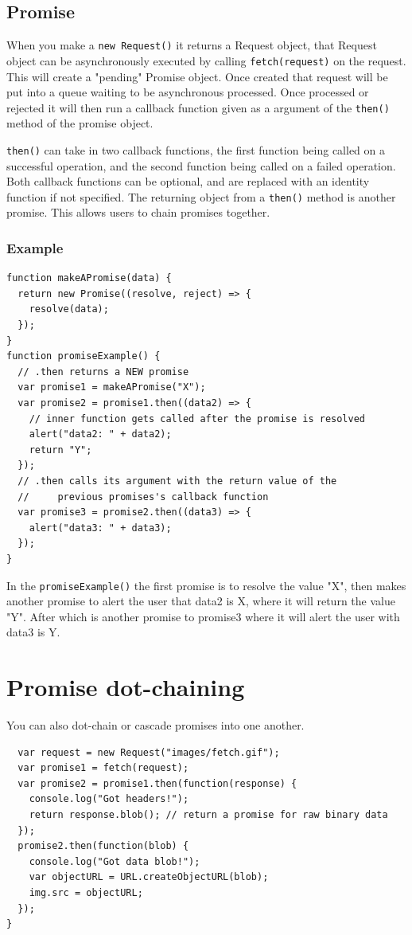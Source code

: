 \documentclass[../CMPUT-404-Notes.tex]{subfiles}
\begin{document}
\subsection{Promise}
When you make a \texttt{new Request()} it returns a Request object, that Request object can be asynchronously executed by calling \texttt{fetch(request)} on the request. This will create a "pending" Promise object. Once created that request will be put into a queue waiting to be asynchronous processed. Once processed or rejected it will then run a callback function given as a argument of the \texttt{then()} method of the promise object. 

\texttt{then()} can take in two callback functions, the first function being called on a successful operation, and the second function being called on a failed operation. 
Both callback functions can be optional, and are replaced with an identity function if not specified. 
The returning object from a \texttt{then()} method is another promise. This allows users to chain promises together. 


\subsubsection{Example}
\begin{verbatim}
function makeAPromise(data) {
  return new Promise((resolve, reject) => {
    resolve(data);
  });
}
function promiseExample() {
  // .then returns a NEW promise
  var promise1 = makeAPromise("X");
  var promise2 = promise1.then((data2) => {
    // inner function gets called after the promise is resolved
    alert("data2: " + data2);
    return "Y";
  });
  // .then calls its argument with the return value of the
  //     previous promises's callback function
  var promise3 = promise2.then((data3) => {
    alert("data3: " + data3);
  });
}
\end{verbatim}
In the \texttt{promiseExample()} the first promise is to resolve the value "X", then makes another promise to alert the user that data2 is X, where it will return the value "Y". After which is another promise to promise3 where it will alert the user with data3 is Y.

\section{Promise dot-chaining}
You can also dot-chain or cascade promises into one another. 
\begin{verbatim}
  var request = new Request("images/fetch.gif");
  var promise1 = fetch(request);
  var promise2 = promise1.then(function(response) {
    console.log("Got headers!");
    return response.blob(); // return a promise for raw binary data
  });
  promise2.then(function(blob) {
    console.log("Got data blob!");
    var objectURL = URL.createObjectURL(blob);
    img.src = objectURL;
  });
}
\end{verbatim}
\end{document}
